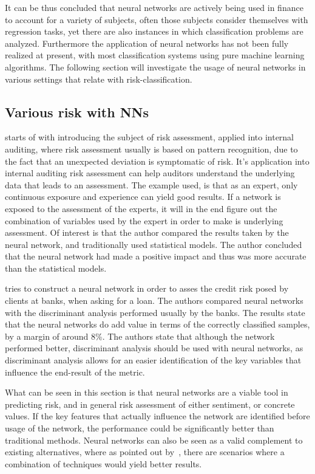 \documentclass[12pt]{article}
\begin{document}
It can be thus concluded that neural networks are actively being used in finance to account for a variety of subjects, often those subjects consider themselves with regression tasks, yet there are also instances in which classification problems are analyzed. Furthermore the application of neural networks has not been fully realized at present, with most classification systems using pure machine learning algorithms. The following section will investigate the usage of neural networks in various settings that relate with risk-classification.

\subsection{Various risk with NNs}
\label{sub:various_risk_nn}

\cite{riskAssesmentInternalAuditing} starts of with introducing the subject of risk assessment, applied into internal auditing, where risk assessment usually is based on pattern recognition, due to the fact that an unexpected deviation is symptomatic of risk. It's application into internal auditing risk assessment can help auditors understand the underlying data that leads to an assessment. The example used, is that as an expert, only continuous exposure and experience can yield good results. If a network is exposed to the assessment of the experts, it will in the end figure out the combination of variables used by the expert in order to make is underlying assessment. Of interest is that the author compared the results taken by the neural network, and traditionally used statistical models. The author concluded that the neural network had made a positive impact and thus was more accurate than the statistical models.

\cite{14_1_3.pdf} tries to construct a neural network in order to asses the credit risk posed by clients at banks, when asking for a loan. The authors compared neural networks with the discriminant analysis performed usually by the banks. The results state that the neural networks do add value in terms of the correctly classified samples, by a margin of around 8\%. The authors state that although the network performed better, discriminant analysis should be used with neural networks, as discriminant analysis allows for an easier identification of the key variables that influence the end-result of the metric.

What can be seen in this section is that neural networks are a viable tool in predicting risk, and in general risk assessment of either sentiment, or concrete values. If the key features that actually influence the network are identified before usage of the network, the performance could be significantly better than traditional methods. Neural networks can also be seen as a valid complement to existing alternatives, where as pointed out by~\cite{14_1_3.pdf}, there are scenarios where a combination of techniques would yield better results.
\end{document}
